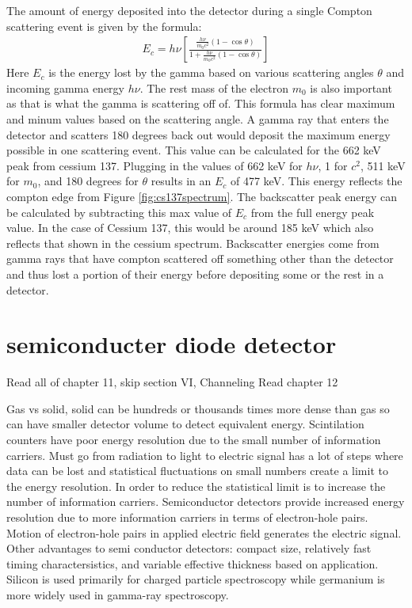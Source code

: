 The amount of energy deposited into the detector during a single Compton scattering event is given by the formula:
\begin{align}
  E_c=h\nu \left[ \frac{ \frac{h\nu}{m_0c^2}(1-\cos \theta ) }{1+\frac{h\nu}{m_0c^2}(1-\cos \theta )} \right]
\end{align}
Here $E_c$ is the energy lost by the gamma based on various scattering angles $\theta$ and incoming gamma energy $h\nu$.
The rest mass of the electron $m_0$ is also important as that is what the gamma is scattering off of.
This formula has clear maximum and minum values based on the scattering angle.
A gamma ray that enters the detector and scatters 180 degrees back out would deposit the maximum energy possible in one scattering event.
This value can be calculated for the 662 keV peak from cessium 137.
Plugging in the values of 662 keV for $h\nu$, 1 for $c^2$, 511 keV for $m_0$, and 180 degrees for $\theta$ results in an $E_c$ of 477 keV.
This energy reflects the compton edge from Figure \ref{fig:cs137spectrum}.
The backscatter peak energy can be calculated by subtracting this max value of $E_c$ from the full energy peak value.
In the case of Cessium 137, this would be around 185 keV which also reflects that shown in the cessium spectrum.
Backscatter energies come from gamma rays that have compton scattered off something other than the detector and thus lost a portion of their energy before depositing some or the rest in a detector.

\section{semiconducter diode detector} 
Read all of chapter 11, skip section VI, Channeling
Read chapter 12

Gas vs solid, solid can be hundreds or thousands times more dense than gas so can have smaller detector volume to detect equivalent energy.
Scintilation counters have poor energy resolution due to the small number of information carriers.
Must go from radiation to light to electric signal has a lot of steps where data can be lost and statistical fluctuations on small numbers create a limit to the energy resolution.
In order to reduce the statistical limit is to increase the number of information carriers.
Semiconductor detectors provide increased energy resolution due to more information carriers in terms of electron-hole pairs.
Motion of electron-hole pairs in applied electric field generates the electric signal.
Other advantages to semi conductor detectors: compact size, relatively fast timing charactersistics, and variable effective thickness based on application.
Silicon is used primarily for charged particle spectroscopy while germanium is more widely used in gamma-ray spectroscopy.

